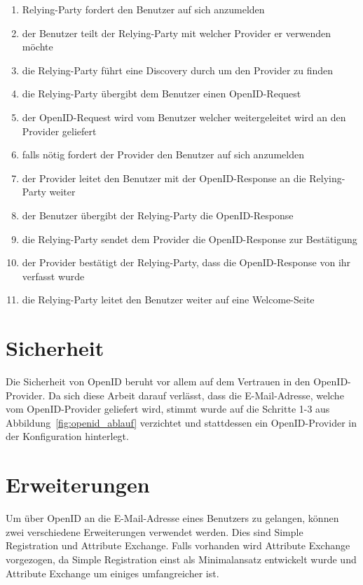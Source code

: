 \begin{enumerate}
  \item Relying-Party fordert den Benutzer auf sich anzumelden
  \item der Benutzer teilt der Relying-Party mit welcher Provider er verwenden möchte
  \item die Relying-Party führt eine Discovery durch um den Provider zu finden
  \item die Relying-Party übergibt dem Benutzer einen OpenID-Request
  \item der OpenID-Request wird vom Benutzer welcher weitergeleitet wird an den Provider geliefert
  \item falls nötig fordert der Provider den Benutzer auf sich anzumelden
  \item der Provider leitet den Benutzer mit der OpenID-Response an die Relying-Party weiter
  \item der Benutzer übergibt der Relying-Party die OpenID-Response
  \item die Relying-Party sendet dem Provider die OpenID-Response zur Bestätigung
  \item der Provider bestätigt der Relying-Party, dass die OpenID-Response von ihr verfasst wurde
  \item die Relying-Party leitet den Benutzer weiter auf eine Welcome-Seite
\end{enumerate}

\section{Sicherheit}
\label{sec:sicherheit}
Die Sicherheit von OpenID beruht vor allem auf dem Vertrauen in den OpenID-Provider. Da sich diese Arbeit darauf verlässt, dass die E-Mail-Adresse, welche vom OpenID-Provider geliefert wird, stimmt wurde auf die Schritte 1-3 aus Abbildung~\ref{fig:openid_ablauf} verzichtet und stattdessen ein OpenID-Provider in der Konfiguration hinterlegt.

\section{Erweiterungen}
\label{sec:erweiterungen}
Um über OpenID an die E-Mail-Adresse eines Benutzers zu gelangen, können zwei verschiedene Erweiterungen verwendet werden. Dies sind Simple Registration\cite{openid/sreg1.0} und Attribute Exchange\cite{openid/ax1.0}. Falls vorhanden wird Attribute Exchange vorgezogen, da Simple Registration einst als Minimalansatz entwickelt wurde und Attribute Exchange um einiges umfangreicher ist. 